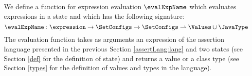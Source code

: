  

%
%                                                     
%                                          
%                                       

 
We define a function for expression evaluation
 $\evalExpName$ which evaluates expressions in a state and which has the following signature:
$$
\evalExpName : \expression \rightarrow \SetConfigs  \rightarrow \SetConfigs  \rightharpoonup  \Values \cup \JavaType
$$
The evaluation function   takes as arguments an expression of the assertion language presented in the previous Section 
\ref{assertLang:lang} and two states (see Section \ref{def} for the definition of state)  and returns a value or a class type
(see Section \ref{types} for the definition of values and types in the language). 


